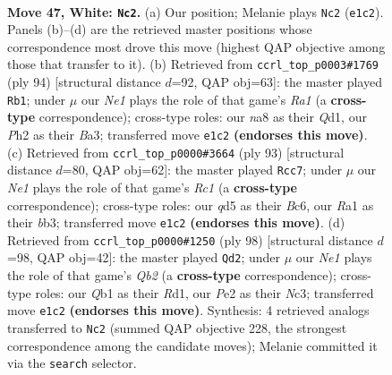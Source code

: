 \documentclass[11pt]{article}
\begin{document}
\clearpage

\begin{figure}[p]\centering
\begin{subfigure}{0.46\textwidth}\centering
\resizebox{\linewidth}{!}{%
\newchessgame
\chessboard[
  setfen={nr4k1/4b1n1/p4r2/P1pq1p1p/3p1Pp1/1P4P1/1R1BP2P/RQ1NN1K1 w - - 10 47},
  showmover=false,
  pgfstyle=straightmove, color=movearrow, markmove={e1-c2}
]}
\caption{}
\end{subfigure}\hfill
\begin{subfigure}{0.46\textwidth}\centering
\resizebox{\linewidth}{!}{%
\newchessgame
\chessboard[
  setfen={1n2r3/2q3nk/1p2p2p/p2p1rp1/P1pP2N1/B1P4P/2P2PP1/R2QR1K1 w - - 4 48},
  showmover=false,
  pgfstyle=straightmove, color=movearrow, markmove={a1-b1}
]}
\caption{}
\end{subfigure}
\\[4pt]
\begin{subfigure}{0.46\textwidth}\centering
\resizebox{\linewidth}{!}{%
\newchessgame
\chessboard[
  setfen={2r3k1/3rqp2/1pbpn1p1/7p/1PP1Pp1P/1BQR1N2/5PP1/4R1K1 b - - 24 47},
  showmover=false,
  pgfstyle=straightmove, color=movearrow, markmove={c8-c7}
]}
\caption{}
\end{subfigure}\hfill
\begin{subfigure}{0.46\textwidth}\centering
\resizebox{\linewidth}{!}{%
\newchessgame
\chessboard[
  setfen={1qr1n1k1/r4pp1/1pbpp2p/8/1PP1PP2/2N2B1P/1Q4P1/2RR3K w - - 45 50},
  showmover=false,
  pgfstyle=straightmove, color=movearrow, markmove={b2-d2}
]}
\caption{}
\end{subfigure}
\caption{\textbf{Move 47, White: \texttt{Nc2}.} (a) Our position; Melanie plays \texttt{Nc2} (\texttt{e1c2}). Panels (b)--(d) are the retrieved master positions whose correspondence most drove this move (highest QAP objective among those that transfer to it). (b) Retrieved from \texttt{ccrl\_top\_p0003\#1769} (ply 94) [structural distance $d$=92, QAP obj=63]: the master played \texttt{Rb1}; under $\mu$ our \emph{Ne1} plays the role of that game's \emph{Ra1} (a \textbf{cross-type} correspondence); cross-type roles: our \emph{n}a8 as their \emph{Q}d1, our \emph{P}h2 as their \emph{B}a3; transferred move \texttt{e1c2} \textbf{(endorses this move)}. (c) Retrieved from \texttt{ccrl\_top\_p0000\#3664} (ply 93) [structural distance $d$=80, QAP obj=62]: the master played \texttt{Rcc7}; under $\mu$ our \emph{Ne1} plays the role of that game's \emph{Rc1} (a \textbf{cross-type} correspondence); cross-type roles: our \emph{q}d5 as their \emph{B}c6, our \emph{R}a1 as their \emph{b}b3; transferred move \texttt{e1c2} \textbf{(endorses this move)}. (d) Retrieved from \texttt{ccrl\_top\_p0000\#1250} (ply 98) [structural distance $d$=98, QAP obj=42]: the master played \texttt{Qd2}; under $\mu$ our \emph{Ne1} plays the role of that game's \emph{Qb2} (a \textbf{cross-type} correspondence); cross-type roles: our \emph{Q}b1 as their \emph{R}d1, our \emph{P}e2 as their \emph{N}c3; transferred move \texttt{e1c2} \textbf{(endorses this move)}. Synthesis: 4 retrieved analogs transferred to \texttt{Nc2} (summed QAP objective 228, the strongest correspondence among the candidate moves); Melanie committed it via the \texttt{search} selector.}
\label{fig:thought-m92}
\end{figure}
\end{document}
